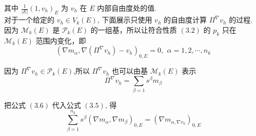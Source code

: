 \documentclass[12pt]{article}
\begin{document}
\begin{CJK}{UTF8}{gkai}
    其中 $\frac{1}{|E|} (1, v_h)_E$ 为 $v_h$ 在 $E$ 内部自由度处的值.\\
    
    对于一个给定的 $v_h \in V_k(E)$, 下面展示只使用 $v_h$ 的自由度计算 $\Pi^{\nabla}v_h$ 的过程. \\
    
    因为 $\mathcal M _k(E)$ 是 $\mathcal P_k(E)$ 的一组基，所以让符合性质 $(3.2)$ 的 $p_k$ 只在 $\mathcal M _k(E)$ 范围内变化，即 \\
    \begin{equation}
    (\nabla m_{\alpha}, \nabla(\Pi^{\nabla}v_h) - v_h)_{0,E} = 0,\,\ \alpha = 1,2,\cdots, n_k
    \end{equation}
    
    因为 $\Pi^{\nabla}v_h \in \mathcal P_k(E)$,所以 $\Pi^{\nabla}v_h$ 也可以由基 $\mathcal M_k(E)$ 表示\\
    \begin{equation}
    \Pi^\nabla v_h = \sum_{\beta = 1}s^{\beta}m_\beta
    \end{equation}
    
    把公式 $(3.6)$ 代入公式 $(3.5)$, 得 \\
    \begin{equation}
    \sum_{\beta = 1}^{n_k}s^{\beta}(\nabla m_{\alpha},\nabla m_{\beta})_{0,E} = (\nabla m_{\alpha, \nabla v_h})_{0,E}
    \end{equation}
    

\end{CJK}
\end{document}
